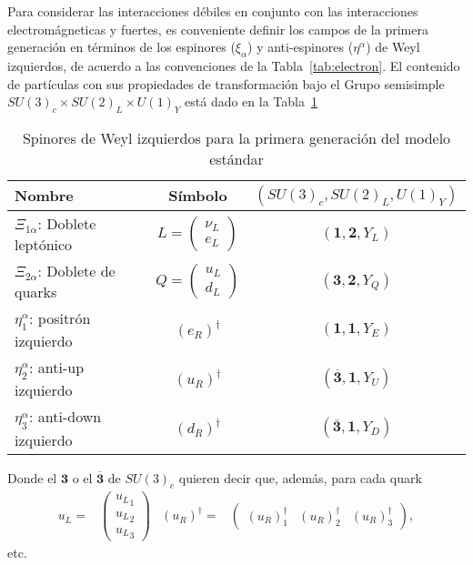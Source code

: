 \begin{frame}
Para considerar las interacciones débiles en conjunto con las interacciones electromágneticas y fuertes, es conveniente definir los campos de la primera generación en términos de los espinores ($\xi_{\alpha}$) y anti-espinores ($\eta^{\alpha}$) de Weyl izquierdos, de acuerdo a las convenciones de la Tabla~\ref{tab:electron}. El contenido de partículas con sus propiedades de transformación bajo el Grupo semisimple $SU(3)_c\times SU(2)_L\times U(1)_Y$ está dado en la Tabla~\ref{tab:fgw}
\begin{table}
  \centering
  \begin{tabular}{l|c|c}\hline
    Nombre & Símbolo & $\left( SU(3)_c, SU(2)_L, U(1)_Y \right)$\\\hline
    $\Xi_{1\alpha}$: Doblete leptónico & $L=\displaystyle{\begin{pmatrix}
      \nu_L\\
      e_L      
    \end{pmatrix}}$ & $\left( \mathbf{1},\mathbf{2},Y_L \right)$\\
    $\Xi_{2\alpha}$: Doblete de quarks & $Q=\displaystyle{\begin{pmatrix}
      u_L\\
      d_L      
    \end{pmatrix}}$ & $\left( \mathbf{3},\mathbf{2},Y_Q \right)$\\
   $\eta^{\alpha}_1$: positrón izquierdo & $\left( e_R \right)^{\dagger}$&$\left(\mathbf{1},\mathbf{1},Y_{E}\right)$ \\
   $\eta^{\alpha}_2$: anti-up izquierdo & $\left( u_R \right)^{\dagger}$&$\left(\overline{\mathbf{3}},\mathbf{1},Y_{U}\right)$ \\
   $\eta^{\alpha}_3$: anti-down izquierdo & $\left( d_R \right)^{\dagger}$&$\left(\overline{\mathbf{3}},\mathbf{1},Y_{D}\right)$ \\
  \end{tabular}
  \caption{Spinores de Weyl izquierdos para la primera generación del modelo estándar}
  \label{tab:fgw}
\end{table}

Donde el $\mathbf{3}$ o el $\overline{\mathbf{3}}$ de $SU(3)_c$ quieren decir que, además, para cada quark
\begin{align}
u_L=&
\begin{pmatrix}
  {u_{L}}_1\\
  {u_{L}}_2\\
  {u_{L}}_3
\end{pmatrix}&
  \left( u_R \right)^{\dagger}=&
  \begin{pmatrix}
    \left( u_R \right)^{\dagger}_1&
        \left( u_R \right)^{\dagger}_2&    \left( u_R \right)^{\dagger}_3
  \end{pmatrix},
\end{align}
etc.


\end{frame}
